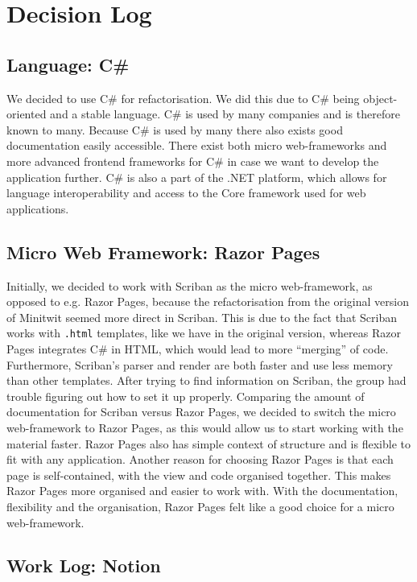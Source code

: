 \section{Decision Log}
\label{appendix:decision-log}
\subsection{Language: C\#}

We decided to use C\# for refactorisation. We did this due to C\# being object-oriented and a stable language. C\# is used by many companies and is therefore known to many. Because C\# is used by many there also exists good documentation easily accessible.
There exist both micro web-frameworks and more advanced frontend frameworks for C\# in case we want to develop the application further.
C\# is also a part of the .NET platform, which allows for language interoperability and access to the Core framework used for web applications.

\subsection{Micro Web Framework: Razor Pages}

Initially, we decided to work with Scriban as the micro web-framework, as opposed to e.g. Razor Pages, because the refactorisation from the original version of Minitwit seemed more direct in Scriban. This is due to the fact that Scriban works with \texttt{.html} templates, like we have in the original version, whereas Razor Pages integrates C\# in HTML, which would lead to more “merging” of code.
Furthermore, Scriban's parser and render are both faster and use less memory than other templates.
After trying to find information on Scriban, the group had trouble figuring out how to set it up properly. Comparing the amount of documentation for Scriban versus Razor Pages, we decided to switch the micro web-framework to Razor Pages, as this would allow us to start working with the material faster.
Razor Pages also has simple context of structure and is flexible to fit with any application. Another reason for choosing Razor Pages is that each page is self-contained, with the view and code organised together. This makes Razor Pages more organised and easier to work with. With the documentation, flexibility and the organisation, Razor Pages felt like a good choice for a micro web-framework.

\subsection{Work Log: Notion}

